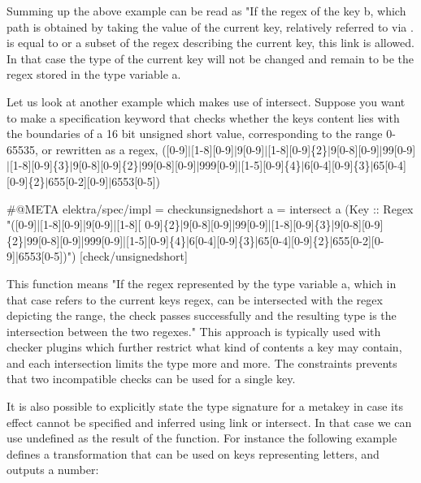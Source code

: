 Summing up the above example can be read as "If the regex of the key b, which path is obtained by taking the value of the current key, relatively referred to via {\ttfamily .} is equal to or a subset of the regex describing the current key, this link is allowed. In that case the type of the current key will not be changed and remain to be the regex stored in the type variable a.

Let us look at another example which makes use of {\ttfamily intersect}. Suppose you want to make a specification keyword that checks whether the key\textquotesingle{}s content lies with the boundaries of a 16 bit unsigned short value, corresponding to the range 0-\/65535, or rewritten as a regex, {\ttfamily (\mbox{[}0-\/9\mbox{]}$\vert$\mbox{[}1-\/8\mbox{]}\mbox{[}0-\/9\mbox{]}$\vert$9\mbox{[}0-\/9\mbox{]}$\vert$\mbox{[}1-\/8\mbox{]}\mbox{[}0-\/9\mbox{]}\{2\}$\vert$9\mbox{[}0-\/8\mbox{]}\mbox{[}0-\/9\mbox{]}$\vert$99\mbox{[}0-\/9\mbox{]}$\vert$\mbox{[}1-\/8\mbox{]}\mbox{[}0-\/9\mbox{]}\{3\}$\vert$9\mbox{[}0-\/8\mbox{]}\mbox{[}0-\/9\mbox{]}\{2\}$\vert$99\mbox{[}0-\/8\mbox{]}\mbox{[}0-\/9\mbox{]}$\vert$999\mbox{[}0-\/9\mbox{]}$\vert$\mbox{[}1-\/5\mbox{]}\mbox{[}0-\/9\mbox{]}\{4\}$\vert$6\mbox{[}0-\/4\mbox{]}\mbox{[}0-\/9\mbox{]}\{3\}$\vert$65\mbox{[}0-\/4\mbox{]}\mbox{[}0-\/9\mbox{]}\{2\}$\vert$655\mbox{[}0-\/2\mbox{]}\mbox{[}0-\/9\mbox{]}$\vert$6553\mbox{[}0-\/5\mbox{]})}


\begin{DoxyCode}
#@META elektra/spec/impl = checkunsignedshort a = intersect a (Key :: Regex
       "([0-9]|[1-8][0-9]|9[0-9]|[1-8][
      0-9]\{2\}|9[0-8][0-9]|99[0-9]|[1-8][0-9]\{3\}|9[0-8][0-9]\{2\}|99[0-8][0-9]|999[0-9]|[1-5][0-9]\{4\}|6[0-4][0-9]\{3\}|65[0-4][0-9]\{2\}|655[0-2][0-9]|6553[0-5])")
[check/unsignedshort]
\end{DoxyCode}


This function means "If the regex represented by the type variable a, which in that case refers to the current key\textquotesingle{}s regex, can be intersected with the regex depicting the range, the check passes successfully and the resulting type is the intersection between the two regexes." This approach is typically used with checker plugins which further restrict what kind of contents a key may contain, and each intersection limits the type more and more. The constraints prevents that two incompatible checks can be used for a single key.

It is also possible to explicitly state the type signature for a metakey in case its effect cannot be specified and inferred using {\ttfamily link} or {\ttfamily intersect}. In that case we can use {\ttfamily undefined} as the result of the function. For instance the following example defines a transformation that can be used on keys representing letters, and outputs a number\+:


